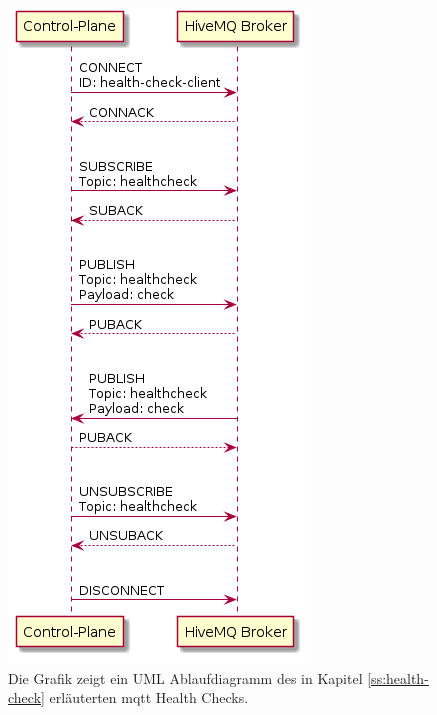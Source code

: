\begin{figure}
    \centering
    \includegraphics[scale=0.5]{gen/health-check.png}
    \caption{Die Grafik zeigt ein UML Ablaufdiagramm des in Kapitel \ref{ss:health-check} erläuterten \ac{mqtt} Health Checks.}
    \label{fig:health-check-sequence}
\end{figure}

